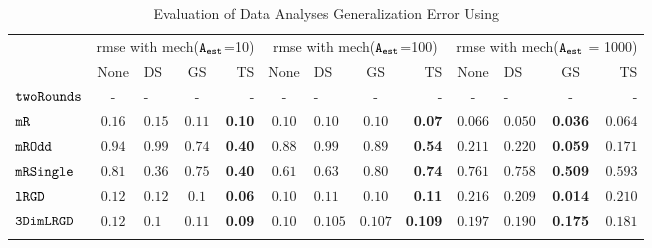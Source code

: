 {\footnotesize
\begin {table}[t]
        \vspace{-0.5cm}
        \caption{Evaluation of Data Analyses Generalization Error Using {\THESYSTEM}}
    \vspace{-0.4cm}
        \label{tb:adapt-generalization}
        \begin{center}
        \centering
{
        \begin{tabular}{|| >{\tiny}l || c | l | c | r || c | l | c | r || c | l | c | r || }
                \hhline{t|:============= :t:|}
        \multirow{2}{*}{Program $c$}
         & \multicolumn{4}{c||}{rmse with mech(${\mathtt{A_{est}}}$=10)}
         & \multicolumn{4}{c||}{rmse with mech(${\mathtt{A_{est}}}$=100)}  & \multicolumn{4}{c||}{rmse with mech(${\mathtt{A_{est}}}$ = 1000)}  \\ 
         \hhline{||~----||----||----||}
        & None  & DS & GS & TS  & None  & DS & GS & TS & None & DS & GS & TS \\ 
         \hline \hline
        $  \mathtt{ twoRounds }$   & -  & - & - & -  & -  & - & - & - & -  & - & - & -  \\
        \hhline{||-||---||-||----||----||}
         $  \mathtt{ mR}$  & $0.16$   & $0.15$  & $0.11 $ & \textbf{0.10} & $0.10$  & $0.10$ & $0.10$ & \textbf{0.07}  & $0.066$   & $0.050$ & {\textbf{0.036}} & $0.064$  \\
         \hhline{||-||---||-||----||----||}
         $  \mathtt{ mROdd }$ & $0.94$   & $0.99$ & $0.74$ & {\textbf{0.40}} & $0.88$ & $0.99$ & $0.89$ & \textbf{0.54}  & $0.211$   & $0.220$ & {\textbf{0.059}} & $0.171$  \\
         \hhline{||-||---||-||----||----||}
         $  \mathtt{ mRSingle }$  & $0.81$   & $0.36$ & $ 0.75$ & {\textbf{0.40}} & $0.61$ & $0.63$ & $0.80$ & \textbf{0.74}  & $ 0.761$   & $ 0.758$ & {\textbf{0.509}} & $ 0.593$  \\
         \hhline{||-||---||-||----||----||}
         $  \mathtt{ lRGD }$  & $0.12$   & $0.12$ & $ 0.1 $ & \textbf{0.06} & $0.10$  & $0.11$ & $0.10$ & \textbf{0.11}  & $0.216$   & $0.209$ & \textbf{0.014} & $0.210$  \\
         \hhline{||-||---||-||----||----||}
         $  \mathtt{ 3DimLRGD }$  & $0.12$   & $0.1$ & $0.11$ & \textbf{0.09} & $0.10$  & $0.105$ & $0.107$ & \textbf{0.109}  & $0.197$   & $0.190$ & \textbf{0.175} & $0.181$  \\
         \hhline{||-||---||-||----||----||}

\end{tabular}}
\end{center}
\end{table}}
